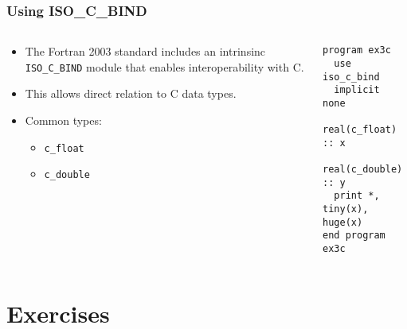 \documentclass[10pt,aspectratio=169]{beamer}
\begin{document}
\begin{frame}[fragile]
  \frametitle{Using ISO\_C\_BIND}
  \begin{columns}[T]
    \begin{column}{0.5\textwidth}
      \begin{itemize}
        \item The Fortran 2003 standard includes an intrinsinc \texttt{ISO\_C\_BIND} module that enables interoperability with C.
        \item This allows direct relation to C data types.
        \item Common types:
          \begin{itemize}
            \item \texttt{c\_float}
            \item \texttt{c\_double}
          \end{itemize}
      \end{itemize}
    \end{column}

    \begin{column}{0.5\textwidth}
      \begin{lstlisting}
program ex3c
  use iso_c_bind
  implicit none
  real(c_float) :: x
  real(c_double) :: y
  print *, tiny(x), huge(x)
end program ex3c
      \end{lstlisting}
    \end{column}
  \end{columns}
\end{frame}

\section{Exercises}
\end{document}
